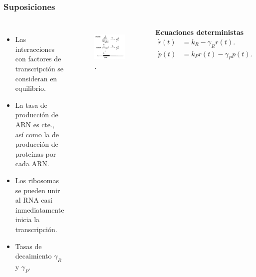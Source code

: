 \documentclass{beamer}
\begin{document}
\begin{frame}
\frametitle{Suposiciones}
\begin{columns}[c]
\begin{itemize}
\item Las interacciones con factores de transcripci\'on se consideran en equilibrio.
\item La tasa de producci\'on de ARN es cte., as\'i como la de producci\'on de prote\'inas por cada ARN.
\item Los ribosomas se pueden unir al RNA casi inmediatamente inicia la transcripci\'on.
\item Tasas de decaimiento $\gamma_R$ y $\gamma_P$.
\end{itemize}
\begin{figure}[p]
    \centering
    \includegraphics[width=1\textwidth]{expressionsimple.png}\\
    \tiny \cite{p1}.
\end{figure}
\centering \textbf{Ecuaciones deterministas}
\begin{align*}
\dot{r}(t) &= k_R - \gamma_Rr(t).\\
\dot{p}(t) &= k_Pr(t) - \gamma_Pp(t).
\end{align*}
\end{columns}
\end{frame}


\end{document}
